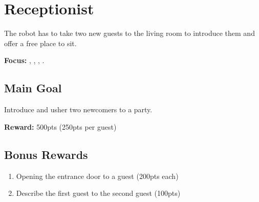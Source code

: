 \section{Receptionist}
\label{test:receptionist}
The robot has to take two new guests to the living room to introduce them and offer a free place to sit.

\noindent \textbf{Focus:} \SysI{}, \HRI{}, \PerDet{}, \PerRec.

\vspace{-5pt} %
\subsection*{Main Goal}
Introduce and usher two newcomers to a party.

\noindent\textbf{Reward:} 500pts (250pts per guest)

\vspace{-5pt}
\subsection*{Bonus Rewards}
\begin{enumerate}[nosep]
	\item Opening the entrance door to a guest (200pts each)
	\item Describe the first guest to the second guest  (100pts)
\end{enumerate}


